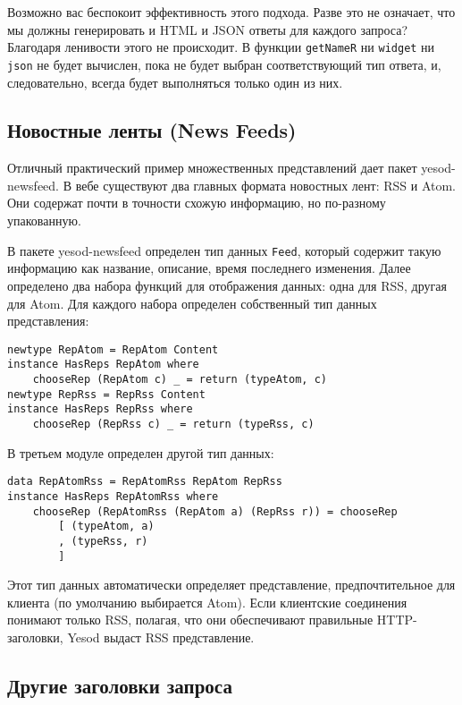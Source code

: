 Возможно вас беспокоит эффективность этого подхода. Разве это не означает, что мы должны генерировать и HTML и JSON ответы для каждого запроса? Благодаря ленивости этого не происходит. В функции \lstinline'getNameR' ни \lstinline'widget' ни \lstinline'json' не будет вычислен, пока не будет выбран соответствующий тип ответа, и, следовательно, всегда будет выполняться только один из них.

\subsection{Новостные ленты (News Feeds)}

Отличный практический пример множественных представлений дает пакет yesod-newsfeed. В вебе существуют два главных формата новостных лент: RSS и Atom. Они содержат почти в точности схожую информацию, но по-разному упакованную.

В пакете yesod-newsfeed определен тип данных \lstinline'Feed', который содержит такую информацию как название, описание, время последнего изменения. Далее определено два набора функций для отображения данных: одна для RSS, другая для Atom. Для каждого набора определен собственный тип данных представления:

\begin{lstlisting}
newtype RepAtom = RepAtom Content
instance HasReps RepAtom where
    chooseRep (RepAtom c) _ = return (typeAtom, c)
newtype RepRss = RepRss Content
instance HasReps RepRss where
    chooseRep (RepRss c) _ = return (typeRss, c)
\end{lstlisting}

В третьем модуле определен другой тип данных:

\begin{lstlisting}
data RepAtomRss = RepAtomRss RepAtom RepRss
instance HasReps RepAtomRss where
    chooseRep (RepAtomRss (RepAtom a) (RepRss r)) = chooseRep
        [ (typeAtom, a)
        , (typeRss, r)
        ]
\end{lstlisting}

Этот тип данных автоматически определяет представление, предпочтительное для клиента (по умолчанию выбирается Atom). Если клиентские соединения понимают только RSS, полагая, что они обеспечивают правильные HTTP-заголовки, Yesod выдаст RSS представление.

\subsection{Другие заголовки запроса}

